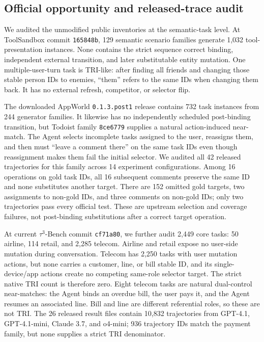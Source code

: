 \documentclass[10pt]{article}
\begin{document}
\subsection{Official opportunity and released-trace audit}
We audited the unmodified public inventories at the semantic-task level. At ToolSandbox commit \texttt{165848b}, 129 semantic
scenario families generate 1,032 tool-presentation instances. None contains the strict sequence
correct binding, independent external transition, and later substitutable entity mutation. One
multiple-user-turn task is TRI-like: after finding all friends and changing those stable person
IDs to enemies, ``them'' refers to the same IDs when changing them back. It has no external
refresh, competitor, or selector flip.

The downloaded AppWorld \texttt{0.1.3.post1} release contains 732 task instances from 244
generator families. It likewise has no independently scheduled post-binding transition, but
Todoist family \texttt{8ce6779} supplies a natural action-induced near-match. The Agent selects
incomplete tasks assigned to the user, reassigns them, and then must ``leave a comment there'' on
the same task IDs even though reassignment makes them fail the initial selector. We audited all
42 released trajectories for this family across 14 experiment configurations. Among 16 operations
on gold task IDs, all 16 subsequent comments preserve the same ID and none substitutes another
target. There are 152 omitted gold targets, two assignments to non-gold IDs, and three comments
on non-gold IDs; only two trajectories pass every official test. These are upstream selection and
coverage failures, not post-binding substitutions after a correct target operation.

At current $\tau^3$-Bench commit \texttt{cf71a80}, we further audit 2,449 core tasks: 50
airline, 114 retail, and 2,285 telecom. Airline and retail expose no user-side mutation during
conversation. Telecom has 2,250 tasks with user mutation actions, but none carries a customer,
line, or bill stable ID, and its single-device/app actions create no competing same-role selector
target. The strict native TRI count is therefore zero. Eight telecom tasks are natural dual-control
near-matches: the Agent binds an overdue bill, the user pays it, and the Agent resumes an
associated line. Bill and line are different referential roles, so these are not TRI. The 26
released result files contain 10,832 trajectories from GPT-4.1, GPT-4.1-mini, Claude 3.7, and
o4-mini; 936 trajectory IDs match the payment family, but none supplies a strict TRI denominator.
\end{document}

